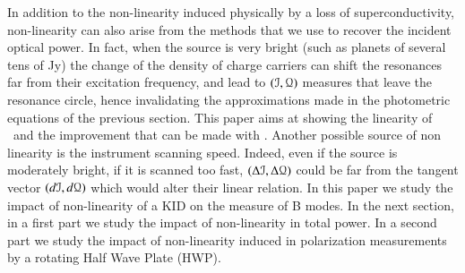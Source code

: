 In addition to the non-linearity induced physically by a loss of superconductivity, non-linearity can also arise from the methods that we use to recover the incident optical power. In fact, when the source is very bright (such as planets of several tens of Jy) the change of the density of charge carriers can shift the resonances far from their excitation frequency, and lead to $(\mathcal{I},\mathcal{Q})$ measures that leave the resonance circle, hence invalidating the approximations made in the photometric equations of the previous section. This paper aims at showing the linearity of \methodu\ and the improvement that can be made with \methodd . Another possible source of non linearity is the instrument scanning speed. Indeed, even if the source is moderately bright, if it is scanned too fast, $(\Delta\mathcal{I},\Delta\mathcal{Q})$ could be far from the tangent vector $(d\mathcal{I},d\mathcal{Q})$ which would alter their linear relation.
In this paper we study the impact of non-linearity of a KID on the measure of B modes. In the next section, in a first part we study the impact of non-linearity in total power. In a second part we study the impact of non-linearity induced in polarization measurements by a rotating Half Wave Plate (HWP).

